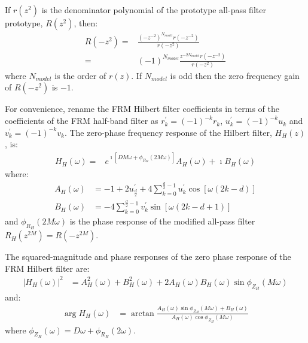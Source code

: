 \documentclass[a4paper,twoside,10pt,english]{report}
\begin{document}
If $r\left(z^{2}\right)$ is the denominator polynomial of the prototype
all-pass filter prototype, $R\left(z^{2}\right)$, then:
\begin{align*}
  R\left(-z^{2}\right)
  =&\frac{\left(-z^{-2}\right)^{N_{model}}r\left(-z^{-2}\right)}
     {r\left(-z^{2}\right)}\\
  =&\left(-1\right)^{N_{model}}
     \frac{z^{-2N_{model}}r\left(-z^{-2}\right)}{r\left(-z^{2}\right)}
\end{align*}
where $N_{model}$ is the order of $r\left(z\right)$. If $N_{model}$ is odd
then the zero frequency gain of $R\left(-z^{2}\right)$ is $-1$.

For convenience, rename the FRM Hilbert filter coefficients in terms of the
coefficients of the FRM half-band filter as
$r^{\prime}_{k}=\left(-1\right)^{-k}r_{k}$,
$u^{\prime}_{k}=\left(-1\right)^{-k}u_{k}$ and
$v^{\prime}_{k}=\left(-1\right)^{-k}v_{k}$.  The zero-phase frequency response
of the Hilbert filter, $H_{H}\left(z\right)$, is:
\begin{align*}
  H_{H}\left(\omega\right)=
  &e^{\imath\left[DM\omega+\phi_{R_{H}}\left(2M\omega\right)\right]}
    A_{H}\left(\omega\right)+\imath B_{H}\left(\omega\right)
\end{align*}
where:
\begin{align*}
A_{H}\left(\omega\right)&=-1+2u^{\prime}_{\frac{d}{2}}+4\sum_{k=0}^{\frac{d}{2}-1}
u^{\prime}_{k}\cos\left[\omega{}\left(2k-d\right)\right] \\
B_{H}\left(\omega\right)&=-4\sum_{k=0}^{\frac{d}{2}-1}
v^{\prime}_{k}\sin\left[\omega{}\left(2k-d+1\right)\right]
\end{align*}
and $\phi_{R_{H}}\left(2M\omega\right)$ is the phase response of the modified
all-pass filter $R_{H}\left(z^{2M}\right)=R\left(-z^{2M}\right)$. 

The squared-magnitude and phase responses of the zero phase response of the 
FRM Hilbert filter are:
\begin{align*}
  \left|H_{H}\left(\omega\right)\right|^{2}
  &=A_{H}^{2}\left(\omega\right)+B_{H}^{2}\left(\omega\right) +
    2A_{H}\left(\omega\right)B_{H}\left(\omega\right)
    \sin\phi_{Z_{H}}\left(M\omega\right)
\end{align*}
and:
\begin{align*}
  \arg H_{H}\left(\omega\right)
  &= \arctan \frac{A_{H}\left(\omega\right)
    \sin\phi_{Z_{H}}\left(M\omega\right)+B_{H}\left(\omega\right)}
    {A_{H}\left(\omega\right)\cos\phi_{Z_{H}}\left(M\omega\right)}
\end{align*}
where $\phi_{Z_{H}}\left(\omega\right)=D\omega+\phi_{R_{H}}\left(2\omega\right)$.
\end{document}
